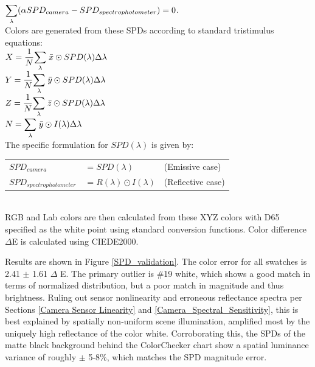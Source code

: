 \documentclass[twocolumn,10pt]{asme2ej}
\newcommand{\id}{\hspace{6 mm}}
\begin{document}
$\mathlarger{ \sum_{\lambda}} ( \alpha SPD_{camera}- SPD_{spectrophotometer} )=0$. \\

Colors are generated from these SPDs according to standard tristimulus equations: \cite{CVRL} \cite{Lindbloom}\\

$X = \dfrac{1}{N} \mathlarger{ \sum_{\lambda}} \hspace{1 mm} \bar{x} \odot SPD(\lambda) \Delta \lambda$\\
$Y = \dfrac{1}{N} \mathlarger{ \sum_{\lambda}} \hspace{1 mm} \bar{y} \odot SPD(\lambda) \Delta \lambda$\\
$Z = \dfrac{1}{N} \mathlarger{ \sum_{\lambda}} \hspace{1 mm} \bar{z} \odot SPD(\lambda) \Delta \lambda$\\
$N = \mathlarger{ \sum_{\lambda}} \hspace{1 mm} \bar{y} \odot I(\lambda) \Delta \lambda$\\

The specific formulation for $SPD(\lambda)$ is given by:\\

\begin{tabular}{l l l}
$SPD_{camera}$ & $= SPD(\lambda)$ & (Emissive case) \\
$SPD_{spectrophotometer}$ & $= R(\lambda) \odot I(\lambda)$ & (Reflective case) \\
\end{tabular}\\

RGB and Lab colors are then calculated from these XYZ colors with D65 specified as the white point using standard conversion functions. \cite{Lindbloom} Color difference $\Delta$E is calculated using CIEDE2000.

\id Results are shown in Figure \ref{SPD_validation}. The color error for all swatches is 2.41 $\pm$ 1.61 $\Delta$ E. The primary outlier is \#19 white, which shows a good match in terms of normalized distribution, but a poor match in magnitude and thus brightness. Ruling out sensor nonlinearity and erroneous reflectance spectra per Sections \ref{Camera Sensor Linearity} and \ref{Camera_Spectral_Sensitivity}, this is best explained by spatially non-uniform scene illumination, amplified most by the uniquely high reflectance of the color white. Corroborating this, the SPDs of the matte black background behind the ColorChecker chart show a spatial luminance variance of roughly $\pm$ 5-8\%, which matches the SPD magnitude error.
\end{document}
